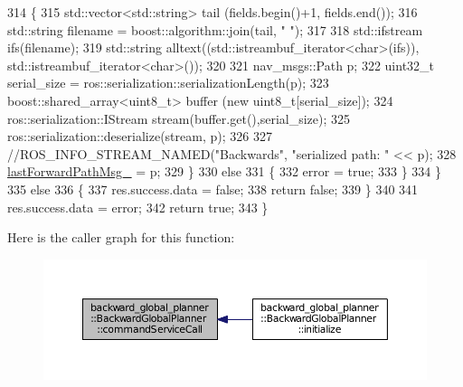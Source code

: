 \begin{DoxyCode}
314         \{
315             std::vector<std::string> tail (fields.begin()+1, fields.end());
316             std::string filename = boost::algorithm::join(tail, \textcolor{stringliteral}{" "});
317 
318             std::ifstream ifs(filename);
319             std::string alltext((std::istreambuf\_iterator<char>(ifs)), std::istreambuf\_iterator<char>());
320 
321             nav\_msgs::Path p;
322             uint32\_t serial\_size = ros::serialization::serializationLength(p);
323             boost::shared\_array<uint8\_t> buffer (\textcolor{keyword}{new} uint8\_t[serial\_size]);
324             ros::serialization::IStream stream(buffer.get(),serial\_size);
325             ros::serialization::deserialize(stream, p);
326 
327             \textcolor{comment}{//ROS\_INFO\_STREAM\_NAMED("Backwards", "serialized path: " << p);}
328             \hyperlink{classbackward__global__planner_1_1BackwardGlobalPlanner_a2fe940d13931d4e6e27e3c3d5e5a7db8}{lastForwardPathMsg\_} = p;
329         \}
330         \textcolor{keywordflow}{else}
331         \{
332             error = \textcolor{keyword}{true};
333         \}
334     \}
335     \textcolor{keywordflow}{else}
336     \{
337         res.success.data = \textcolor{keyword}{false};
338         \textcolor{keywordflow}{return} \textcolor{keyword}{false};
339     \}
340 
341     res.success.data = error;
342     \textcolor{keywordflow}{return} \textcolor{keyword}{true};
343 \}
\end{DoxyCode}


Here is the caller graph for this function\+:
\nopagebreak
\begin{figure}[H]
\begin{center}
\leavevmode
\includegraphics[width=350pt]{classbackward__global__planner_1_1BackwardGlobalPlanner_a2c317353dfc5afdd585c26a7c18abb62_icgraph}
\end{center}
\end{figure}


